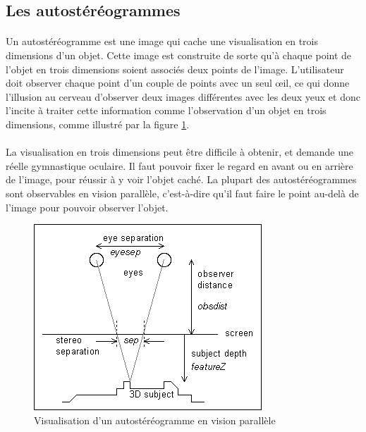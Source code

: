\subsection{Les autostéréogrammes}	

\paragraph{}
	Un autostéréogramme est une image qui cache une visualisation en trois dimensions d’un objet. Cette image est construite de sorte qu'à chaque point de l'objet en trois dimensions soient associés deux points de l'image. L'utilisateur doit observer chaque point d'un couple de points avec un seul œil, ce qui donne l'illusion au cerveau d'observer deux images différentes avec les deux yeux et donc l'incite à traiter cette information comme l'observation d'un objet en trois dimensions, comme illustré par la figure \ref{fig:ppe_autostereogramme}.

\paragraph{}
	La visualisation en trois dimensions peut être difficile à obtenir, et demande une réelle gymnastique oculaire. Il faut pouvoir fixer le regard en avant ou en arrière de l’image, pour réussir à y voir l’objet caché. La plupart des autostéréogrammes sont observables en vision parallèle, c'est-à-dire qu'il faut faire le point au-delà de l'image pour pouvoir observer l'objet.

\begin{figure}[h]
  \centering
  \includegraphics[scale=0.5]{./ppe_autostereogramme.png}
  \caption{Visualisation d’un autostéréogramme en vision parallèle \protect \footnotemark }
  \label{fig:ppe_autostereogramme}
\end{figure}

